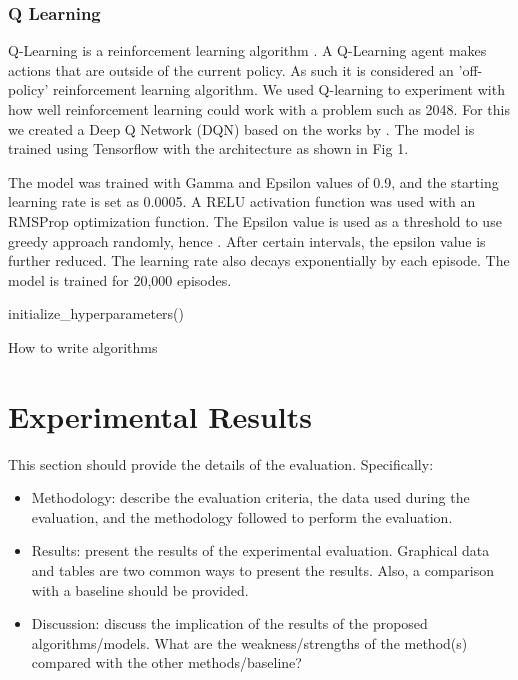 \documentclass{svproc}
\begin{document}
    	\subsubsection{Q Learning}
    	Q-Learning is a reinforcement learning algorithm \cite{watkins1992q}. A Q-Learning agent makes actions that are outside of the current policy. As such it is considered an 'off-policy' reinforcement learning algorithm. We used Q-learning to experiment with how well reinforcement learning could work with a problem such as 2048. For this we created a Deep Q Network (DQN) based on the works by \cite{dqnGit}. The model is trained using Tensorflow with the architecture as shown in Fig 1.
				
		The model was trained with Gamma and Epsilon values of 0.9, and the starting learning rate is set as 0.0005. A RELU activation function was used with an RMSProp optimization function. The Epsilon value is used as a threshold to use greedy approach randomly, hence . After certain intervals, the epsilon value is further reduced. The learning rate also decays exponentially by each episode. The model is trained for 20,000 episodes.
		
\begin{algorithm}[H]
\SetAlgoLined
 initialize_hyperparameters()
 
 \caption{How to write algorithms}
\end{algorithm}
		
    \section{Experimental Results}
    This section should provide the details of the evaluation. Specifically:
    \begin{itemize}
        \item Methodology: describe the evaluation criteria, the data used during the evaluation, and the methodology followed to perform the evaluation.
        \item Results: present the results of the experimental evaluation. Graphical data and tables are two common ways to present the results. Also, a comparison with a baseline should be provided.
        \item Discussion: discuss the implication of the results of the proposed algorithms/models. What are the weakness/strengths of the method(s) compared with the other methods/baseline?
    \end{itemize}
    	
\end{document}
